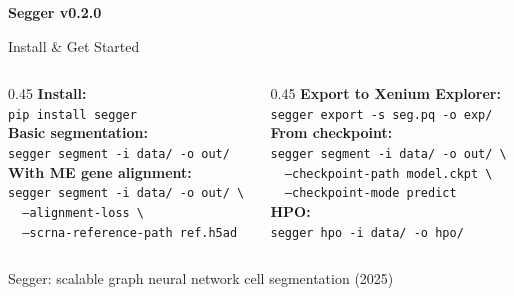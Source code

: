 \documentclass[aspectratio=169,10pt]{beamer}
\begin{document}
\begin{frame}
  \begin{center}
    \vspace{1cm}
    {\Huge \textbf{Segger v0.2.0}}

    \vspace{0.5cm}

    {\Large Install \& Get Started}

    \vspace{0.5cm}

    \begin{columns}
      \begin{column}{0.45\textwidth}
        \centering
        {\small\textbf{Install:}}\\[0.1cm]
        \texttt{pip install segger}\\[0.3cm]
        {\small\textbf{Basic segmentation:}}\\[0.1cm]
        {\small\texttt{segger segment -i data/ -o out/}}\\[0.3cm]
        {\small\textbf{With ME gene alignment:}}\\[0.1cm]
        {\scriptsize\texttt{segger segment -i data/ -o out/ \textbackslash}}\\
        {\scriptsize\texttt{\ \ --alignment-loss \textbackslash}}\\
        {\scriptsize\texttt{\ \ --scrna-reference-path ref.h5ad}}
      \end{column}

      \begin{column}{0.45\textwidth}
        \centering
        {\small\textbf{Export to Xenium Explorer:}}\\[0.1cm]
        {\small\texttt{segger export -s seg.pq -o exp/}}\\[0.3cm]
        {\small\textbf{From checkpoint:}}\\[0.1cm]
        {\scriptsize\texttt{segger segment -i data/ -o out/ \textbackslash}}\\
        {\scriptsize\texttt{\ \ --checkpoint-path model.ckpt \textbackslash}}\\
        {\scriptsize\texttt{\ \ --checkpoint-mode predict}}\\[0.3cm]
        {\small\textbf{HPO:}}\\[0.1cm]
        {\small\texttt{segger hpo -i data/ -o hpo/}}
      \end{column}
    \end{columns}

    \vspace{0.6cm}

    {\footnotesize Segger: scalable graph neural network cell segmentation (2025)}
  \end{center}
\end{frame}
\end{document}
